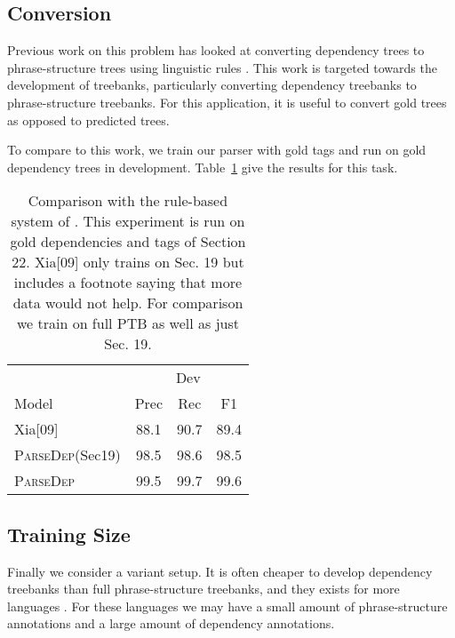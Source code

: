 \documentclass[11pt,letterpaper]{article}
\begin{document}
\subsection{Conversion}

Previous work on this problem has looked at converting dependency trees to phrase-structure trees using linguistic rules \cite{xia2001converting,xia2009towards}. This work is targeted towards the development of treebanks, particularly converting dependency treebanks to phrase-structure treebanks.
For this application, it is useful to convert gold trees as opposed to predicted trees.

To compare to this work, we train our parser with gold tags and run on gold dependency trees in development. Table~\ref{tab:convert} give the results for this task.


\begin{table}
  \centering
  \begin{tabular}{|l|ccc|}

    \hline
    & \multicolumn{3}{|c|}{Dev} \\
    Model & Prec & Rec & F1  \\
    \hline

    \hline
    Xia[09]  & 88.1 & 90.7 & 89.4 \\
    \textsc{ParseDep}(Sec19)  & 98.5 & 98.6 &  98.5  \\
    \textsc{ParseDep}  & 99.5 & 99.7 &  99.6  \\
    \hline

  \end{tabular}
  \caption{Comparison with the rule-based system of . 
    This experiment is run on gold dependencies and tags of Section 22. 
    Xia[09] only trains on Sec. 19 but includes a footnote saying that more data
    would not help. For comparison we train on full PTB as well as just Sec. 19.
  }
  \label{tab:convert}
\end{table}

\subsection{Training Size}

Finally we consider a variant setup. It is often cheaper to develop
dependency treebanks than full phrase-structure treebanks, and they
exists for more languages \cite{}. For these languages we may have a small
amount of phrase-structure annotations and a large amount of dependency annotations.
\end{document}
